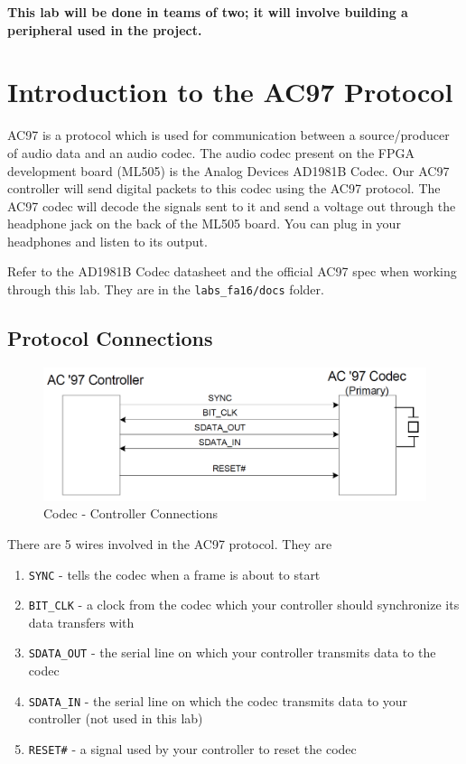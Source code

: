\documentclass[11pt]{article}
\begin{document}
\textbf{This lab will be done in teams of two; it will involve building a peripheral used in the project.}

\section{Introduction to the AC97 Protocol}
AC97 is a protocol which is used for communication between a source/producer of audio data and an audio codec. The audio codec present on the FPGA development board (ML505) is the Analog Devices AD1981B Codec. Our AC97 controller will send digital packets to this codec using the AC97 protocol. The AC97 codec will decode the signals sent to it and send a voltage out through the headphone jack on the back of the ML505 board. You can plug in your headphones and listen to its output.

Refer to the AD1981B Codec datasheet and the official AC97 spec when working through this lab. They are in the \verb|labs_fa16/docs| folder.

\subsection{Protocol Connections}

\begin{figure}[H]
	\begin{center}
		\includegraphics[width=6in]{ac97_connections}
		\caption{Codec - Controller Connections}
	\end{center}
\end{figure}

There are 5 wires involved in the AC97 protocol. They are

\begin{enumerate}
	\item \verb|SYNC| - tells the codec when a frame is about to start
	\item \verb|BIT_CLK| - a clock from the codec which your controller should synchronize its data transfers with
	\item \verb|SDATA_OUT| - the serial line on which your controller transmits data to the codec
	\item \verb|SDATA_IN| - the serial line on which the codec transmits data to your controller (not used in this lab)
	\item \verb|RESET#| - a signal used by your controller to reset the codec
\end{enumerate}
\end{document}
